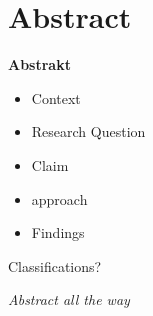 \chapter{Abstract}

\textbf{Abstrakt}

\begin{itemize}
    \item Context
    \item Research Question
    \item Claim 
    \item approach
    \item Findings

\end{itemize}

Classifications?

\textit{Abstract all the way}